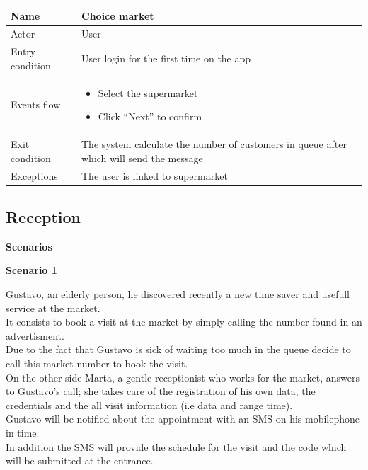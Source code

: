 \par \medskip

\begin{tabular}{|p{5cm} | p{7cm} | }
	\hline
	Name & Choice market  \\
	\hline
	Actor & User \\
	\hline
	Entry condition &
	User login for the first time on the app \\
	\hline
	Events flow & 
	\begin{itemize}
		\item Select the supermarket
		\item Click “Next” to confirm
	\end{itemize} \\
	\hline
	Exit condition &
	The system calculate the number of customers in queue after which will send the message  \\
	\hline 
	Exceptions & 
	The user is linked to supermarket \\
	\hline
\end{tabular}

\par \medskip

\subsection{Reception}
\par \medskip
{\large \textbf{Scenarios}}
\par \medskip
{\normalsize \textbf{Scenario 1}}
\par \medskip
 Gustavo, an elderly person, he discovered recently a new time saver and usefull service at the market. \\
 It consists to book a visit at the market by simply calling the number found in an advertisment. \\
 Due to the fact that Gustavo is sick of waiting too much in the queue decide to call this market number to book the visit. \\
 On the other side Marta, a gentle receptionist who works for the market, answers to Gustavo's call; she takes care of the registration of his own data, the credentials and the all visit information (i.e data and range time).\\
  Gustavo will be notified about the appointment with an SMS on his mobilephone in time. \\
  In addition the SMS will provide the schedule for the visit and the code which will be submitted at the entrance.
 
